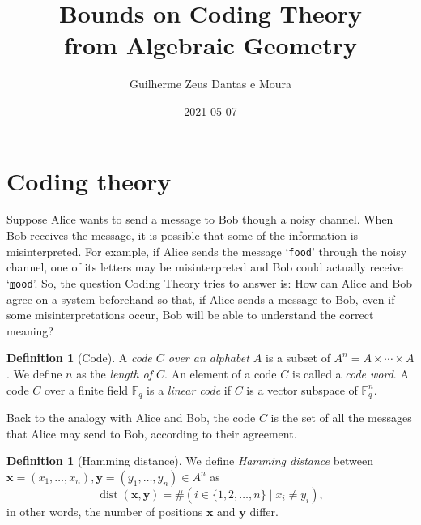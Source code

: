 \documentclass[11pt, oneside]{amsart}
\title[Codes from Algebraic Geometry]{Bounds on Coding Theory\\from Algebraic Geometry}
\author{Guilherme Zeus Dantas e Moura}
\date{2021-05-07} %
\theoremstyle{definition}
\newtheorem{defn}[thm]{Definition}
\theoremstyle{remark}
\numberwithin{equation}{section}
\DeclareMathOperator{\dist}{dist}
\begin{document}
%    

\maketitle

\section{Coding theory} \label{s:codingtheory}

Suppose Alice wants to send a message to Bob though a noisy channel.
When Bob receives the message, it is possible that some of the information is misinterpreted.
For example, if Alice sends the message `\texttt{food}' through the noisy channel, one of its letters may be misinterpreted and Bob could actually receive `\texttt{\underline{m}ood}'.
So, the question Coding Theory tries to answer is:
How can Alice and Bob agree on a system beforehand so that, if Alice sends a message to Bob, even if some misinterpretations occur, Bob will be able to understand the correct meaning?

\begin{defn}[Code] \label{defn:code}
    A \emph{code $C$ over an alphabet $A$} is a subset of $A^n = A \times \cdots \times A$.
    We define $n$ as the \emph{length of $C$}.
	An element of a code $C$ is called a \emph{code word}.
	A code $C$ over a finite field $\mathbb{F}_q$ is a \emph{linear code} if $C$ is a vector subspace of $\mathbb{F}_q^n$.
\end{defn}

Back to the analogy with Alice and Bob, the code $C$ is the set of all the messages that Alice may send to Bob, according to their agreement.

\begin{defn}[Hamming distance] \label{defn:hamming}
    We define \emph{Hamming distance} between $\mathbf{x} = (x_1, \dots, x_n), \mathbf{y} = (y_1, \dots, y_n) \in A^n$ as
    \begin{equation}
		\dist(\mathbf{x}, \mathbf{y}) = \#\left(i \in \{1, 2, \dots, n\} \mid x_i \neq y_i\right),
	\end{equation}
    in other words, the number of positions $\mathbf{x}$ and $\mathbf{y}$ differ.
\end{defn}
\end{document}
